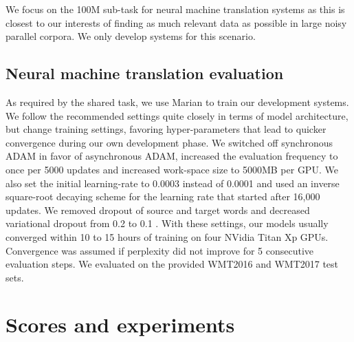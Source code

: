 \documentclass[11pt,a4paper]{article}
\begin{document}
We focus on the 100M sub-task for neural machine translation systems as this is closest to our interests of finding as much relevant data as possible in large noisy parallel corpora. We only develop systems for this scenario.

\subsection{Neural machine translation evaluation}
\label{arch} 


As required by the shared task, we use Marian \cite{marian} to train our development systems. 
%
We follow the recommended settings quite closely in terms of model architecture, but change training settings, favoring hyper-parameters that lead to quicker convergence during our own development phase.
We switched off synchronous ADAM in favor of asynchronous ADAM, increased the evaluation frequency to once per 5000 updates and increased work-space size to 5000MB per GPU. We also set the initial learning-rate to 0.0003 instead of 0.0001 and used an inverse square-root decaying scheme for the learning rate \cite{NIPS2017_7181} that started after 16,000 updates. We removed dropout of source and target words and decreased variational dropout from 0.2 to 0.1 \cite{gal2016theoretically}. With these settings, our models usually converged within 10 to 15 hours of training on four NVidia Titan Xp GPUs. Convergence was assumed if perplexity did not improve for 5 consecutive evaluation steps. We evaluated on the provided WMT2016 and WMT2017 test sets. 

\section{Scores and experiments}
\end{document}
